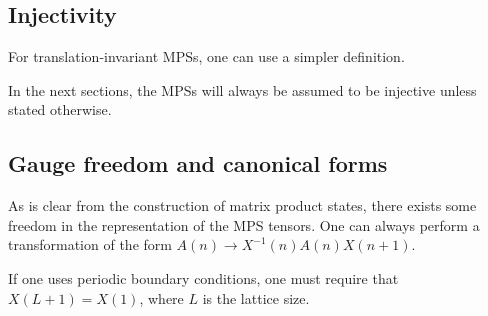 \subsection{Injectivity}

    For translation-invariant MPSs, one can use a simpler definition.

    In the next sections, the MPSs will always be assumed to be injective unless stated otherwise.

\subsection{Gauge freedom and canonical forms}

    \begin{property}
        As is clear from the construction of matrix product states, there exists some freedom in the representation of the MPS tensors. One can always perform a transformation of the form $A(n)\rightarrow X^{-1}(n)A(n)X(n+1)$.
    \end{property}
    \begin{remark}
        If one uses periodic boundary conditions, one must require that $X(L+1)=X(1)$, where $L$ is the lattice size.
    \end{remark}

